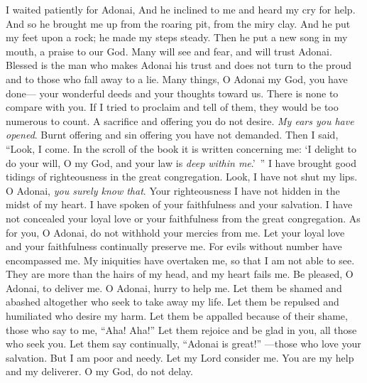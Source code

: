 \begin{biblechapter} %
 I waited patiently for Adonai, 
And he inclined to me 
and heard my cry for help.
\verse And so he brought me up from the roaring pit, 
from the miry clay. 
And he put my feet upon a rock; 
he made my steps steady.
\verse Then he put a new song in my mouth, 
a praise to our God. 
Many will see and fear, 
and will trust Adonai.
\verse Blessed is the man who makes Adonai his trust 
and does not turn to the proud and to those who fall away to a lie.
\verse Many things, O Adonai my God, you have done— 
your wonderful deeds and your thoughts toward us. 
There is none to compare with you. 
If I tried to proclaim and tell of them, 
they would be too numerous to count.
\verse A sacrifice and offering you do not desire. 
\textit{My ears you have opened}. 
Burnt offering and sin offering you have not demanded.
\verse Then I said, “Look, I come. 
In the scroll of the book 
it is written concerning me:
\verse ‘I delight to do your will, O my God, 
and your law is \textit{deep within me}.’ ”
\verse I have brought good tidings of righteousness in the great congregation. 
Look, I have not shut my lips. 
O Adonai, \textit{you surely know that}.
\verse Your righteousness I have not hidden in the midst of my heart. 
I have spoken of your faithfulness and your salvation. 
I have not concealed your loyal love or your faithfulness 
from the great congregation.
\verse As for you, O Adonai, do not withhold your mercies from me. 
Let your loyal love and your faithfulness 
continually preserve me.
\verse For evils without number have encompassed me. 
My iniquities have overtaken me, so that I am not able to see. 
They are more than the hairs of my head, 
and my heart fails me.
\verse Be pleased, O Adonai, to deliver me. 
O Adonai, hurry to help me.
\verse Let them be shamed and abashed altogether 
who seek to take away my life. 
Let them be repulsed and humiliated 
who desire my harm.
\verse Let them be appalled because of their shame, 
those who say to me, “Aha! Aha!”
\verse Let them rejoice and be glad in you, 
all those who seek you. 
Let them say continually, “Adonai is great!” 
—those who love your salvation.
\verse But I am poor and needy. 
Let my Lord consider me. 
You are my help and my deliverer. 
O my God, do not delay.
\end{biblechapter}

